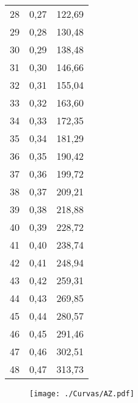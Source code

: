 \documentclass[]{article}
\begin{document}
\begin{longtable}[t]{ccc}
28 & 0,27 & 122,69\\
29 & 0,28 & 130,48\\
30 & 0,29 & 138,48\\
31 & 0,30 & 146,66\\
32 & 0,31 & 155,04\\
33 & 0,32 & 163,60\\
34 & 0,33 & 172,35\\
35 & 0,34 & 181,29\\
36 & 0,35 & 190,42\\
37 & 0,36 & 199,72\\
38 & 0,37 & 209,21\\
39 & 0,38 & 218,88\\
40 & 0,39 & 228,72\\
41 & 0,40 & 238,74\\
42 & 0,41 & 248,94\\
43 & 0,42 & 259,31\\
44 & 0,43 & 269,85\\
45 & 0,44 & 280,57\\
46 & 0,45 & 291,46\\
47 & 0,46 & 302,51\\
48 & 0,47 & 313,73\\*
\end{longtable}

\clearpage

\begin{sidewaysfigure}[htb]
   \centering
   \texttt{[image: ./Curvas/AZ.pdf]}
\end{sidewaysfigure}

\clearpage
\end{document}
